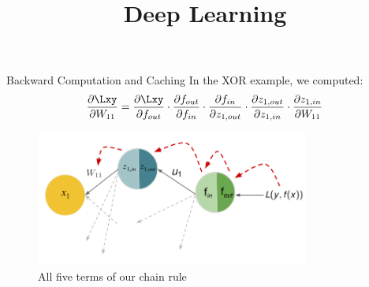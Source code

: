 




\newcommand{\titlefigure}{figure/backprop_gg_new.png}
\newcommand{\learninggoals}{
  \item Efficiency of backpropagation
  \item Caching
  \item Backpropagation formalism
}

\title{Deep Learning}
\date{}





\begin{frame} {Backward Computation and Caching}
    In the XOR example, we computed:
    $$\frac{\partial \Lxy}{\partial W_{11}} = 
        \frac{\partial \Lxy}{\partial f_{out}} \cdot  \textcolor{black}{\frac{\partial f_{out}}{\partial f_{in}}} \cdot  \textcolor{black}{\frac{\partial f_{in}}{\partial z_{1,out}}} \cdot  \textcolor{black}{\frac{\partial z_{1,out}}{\partial z_{1,in}}} \cdot  \textcolor{black}{\frac{\partial z_{1,in}}{\partial W_{11}}} $$
  \begin{figure}
    \centering
      \includegraphics[width=9cm]{figure/backprop_gg1_new.png}
      \caption{All five terms of our chain rule}
  \end{figure}
\end{frame}

